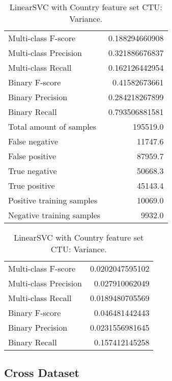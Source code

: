 \begin{table}[H]
\begin{minipage}{0.5\textwidth}
\caption{LinearSVC with Country feature set CTU: Average.}
\centering
\begin{tabular}{l r}
\toprule
Multi-class F-score & 0.188294660908 \\
Multi-class Precision & 0.321886676837 \\
Multi-class Recall & 0.162126442954 \\
\midrule
Binary F-score & 0.41582673661 \\
Binary Precision & 0.284218267899 \\
Binary Recall & 0.793506881581 \\
\midrule
Total amount of samples & 195519.0 \\
False negative & 11747.6 \\
False positive & 87959.7 \\
True negative & 50668.3 \\
True positive & 45143.4 \\
\midrule
Positive training samples & 10069.0 \\
Negative training samples & 9932.0 \\
\bottomrule
\end{tabular}
\end{minipage}
\hfillx
\begin{minipage}{0.5\textwidth}
\caption{LinearSVC with Country feature set CTU: Variance.}
\centering
\begin{tabular}{l r}
\toprule
Multi-class F-score & 0.0202047595102 \\
Multi-class Precision & 0.027910062049 \\
Multi-class Recall & 0.0189480705569 \\
\midrule
Binary F-score & 0.046481442443 \\
Binary Precision & 0.0231556981645 \\
Binary Recall & 0.157412145258 \\
\bottomrule
\end{tabular}
\end{minipage}
\end{table}

\newpage
\subsection{Cross Dataset}


